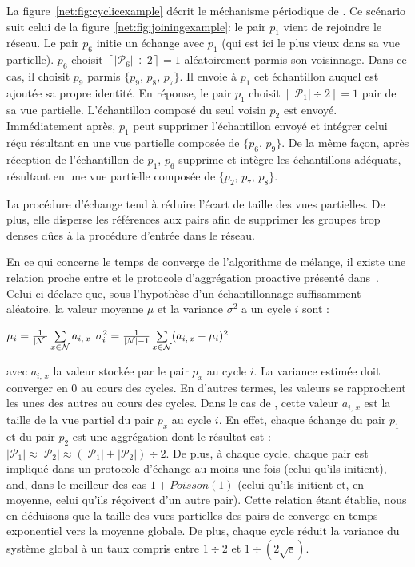 La figure~\ref{net:fig:cyclicexample} décrit le méchanisme périodique de \SPRAY. Ce
scénario suit celui de la figure~\ref{net:fig:joiningexample}: le pair $p_1$ vient
de rejoindre le réseau. Le pair $p_6$ initie un échange avec $p_1$ (qui est ici
le plus vieux dans sa vue partielle). $p_6$ choisit
$\left\lceil{|\mathcal{P}_6|\div 2}\right\rceil = 1$ aléatoirement parmis son
voisinnage. Dans ce cas, il choisit $p_9$ parmis $\{p_9,\,p_8,\,p_7\}$. Il
envoie à $p_1$ cet échantillon auquel est ajoutée sa propre identité. En
réponse, le pair $p_1$ choisit
$\left\lceil{|\mathcal{P}_1|\div 2}\right\rceil = 1$ pair de sa vue
partielle. L'échantillon composé du seul voisin $p_2$ est envoyé. Immédiatement
après, $p_1$ peut supprimer l'échantillon envoyé et intégrer celui réçu
résultant en une vue partielle composée de $\{p_6,\, p_9\}$. De la même façon,
après réception de l'échantillon de $p_1$, $p_6$ supprime et intègre les
échantillons adéquats, résultant en une vue partielle composée de
$\{p_2,\,p_7,\,p_8\}$.

La procédure d'échange tend à réduire l'écart de taille des vues partielles. De
plus, elle disperse les références aux pairs afin de supprimer les groupes trop
denses dûes à la procédure d'entrée dans le réseau.

En ce qui concerne le temps de converge de l'algorithme de mélange, il existe
une relation proche entre \SPRAY et le protocole d'aggrégation proactive
présenté dans~\cite{jelasity2004epidemic, montresor2004robust}. Celui-ci déclare
que, sous l'hypothèse d'un échantillonnage suffisamment aléatoire, la valeur
moyenne $\mu$ et la variance $\sigma^2$ a un cycle $i$ sont :
\begin{center}
  $\mu_i = {1\over{|\mathcal{N}|}} \sum\limits_{x \in \mathcal{N}} a_{i,\,x}$
  \hfill
  $\sigma^2_i = {1\over{|\mathcal{N}|-1}}\sum\limits_{x \in \mathcal{N}}
  (a_{i,\,x} - \mu_i)^2$
\end{center}
avec $a_{i,\,x}$ la valeur stockée par le pair $p_x$ au cycle $i$. La variance
estimée doit converger en 0 au cours des cycles. En d'autres termes, les valeurs
se rapprochent les unes des autres au cours des cycles. Dans le cas de \SPRAY,
cette valeur $a_{i,\,x}$ est la taille de la vue partiel du pair $p_x$ au cycle
$i$. En effet, chaque échange du pair $p_1$ et du pair $p_2$ est une aggrégation
dont le résultat est :
$|\mathcal{P}_1|\approx|\mathcal{P}_2|\approx{(|\mathcal{P}_1| +
  |\mathcal{P}_2|) \div 2}$.
De plus, à chaque cycle, chaque pair est impliqué dans un protocole d'échange au
moins une fois (celui qu'ils initient), and, dans le meilleur des cas
$1+Poisson(1)$ (celui qu'ils initient et, en moyenne, celui qu'ils réçoivent
d'un autre pair). Cette relation étant établie, nous en déduisons que la taille
des vues partielles des pairs de \SPRAY converge en temps exponentiel vers la
moyenne globale. De plus, chaque cycle réduit la variance du système global à un
taux compris entre ${1\div 2}$ et $1\div ({2\sqrt{\text{e}}})$.
